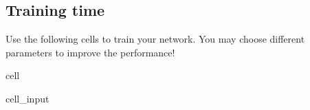 \documentclass[letterpaper,10pt,english]{jupyterBook}
\begin{document}
\subsection{Training time}
\label{\detokenize{notebooks/Tutorial6_Registration/Tutorial6_Registration_student:training-time}}
\sphinxAtStartPar
Use the following cells to train your network. You may choose different parameters to improve the performance!

\begin{sphinxuseclass}{cell}\begin{sphinxVerbatimInput}

\begin{sphinxuseclass}{cell_input}
\begin{sphinxVerbatim}[commandchars=\\\{\}]

  
   
\end{sphinxVerbatim}

\end{sphinxuseclass}\end{sphinxVerbatimInput}

\end{sphinxuseclass}
\end{document}
